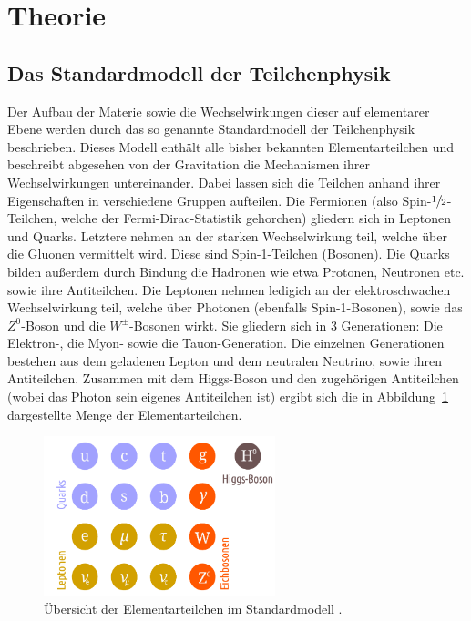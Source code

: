 \section{Theorie}
\label{sec:theorie}

\subsection{Das Standardmodell der Teilchenphysik}

Der Aufbau der Materie sowie die Wechselwirkungen dieser auf elementarer Ebene
werden durch das so genannte Standardmodell der Teilchenphysik beschrieben.
Dieses Modell enthält alle bisher bekannten Elementarteilchen und beschreibt
abgesehen von der Gravitation die Mechanismen ihrer Wechselwirkungen
untereinander. Dabei lassen sich die Teilchen anhand ihrer Eigenschaften in
verschiedene Gruppen aufteilen. Die Fermionen (also
Spin-$\sfrac{1}{2}$-Teilchen, welche der Fermi-Dirac-Statistik gehorchen)
gliedern sich in Leptonen und Quarks. Letztere nehmen an der starken
Wechselwirkung teil, welche über die Gluonen vermittelt wird. Diese sind
Spin-1-Teilchen (Bosonen). Die Quarks bilden außerdem durch Bindung die Hadronen
wie etwa Protonen, Neutronen etc. sowie ihre Antiteilchen. Die Leptonen nehmen
ledigich an der elektroschwachen Wechselwirkung teil, welche über Photonen
(ebenfalls Spin-1-Bosonen), sowie das $Z^0$-Boson und die $W^{\pm}$-Bosonen
wirkt. Sie gliedern sich in 3 Generationen: Die Elektron-, die Myon- sowie die
Tauon-Generation. Die einzelnen Generationen bestehen aus dem geladenen Lepton
und dem neutralen Neutrino, sowie ihren Antiteilchen. Zusammen mit dem
Higgs-Boson und den zugehörigen Antiteilchen (wobei das Photon sein eigenes
Antiteilchen ist) ergibt sich die in Abbildung~\ref{fig:sm} dargestellte Menge
der Elementarteilchen.
%
\begin{figure}[htb]
  \centering
  \includegraphics[width=0.6\textwidth]{figures/standardmodell.png}
  \caption{Übersicht der Elementarteilchen im Standardmodell \cite{KevinBA}.}
  \label{fig:sm}
\end{figure}
